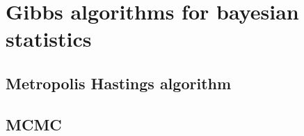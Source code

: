 \documentclass{article}\usepackage[]{graphicx}\usepackage[]{xcolor}
\begin{document}

\section{Gibbs algorithms for bayesian statistics}

\subsection{Metropolis Hastings algorithm}

\subsection{MCMC}


\newpage



\end{document}
